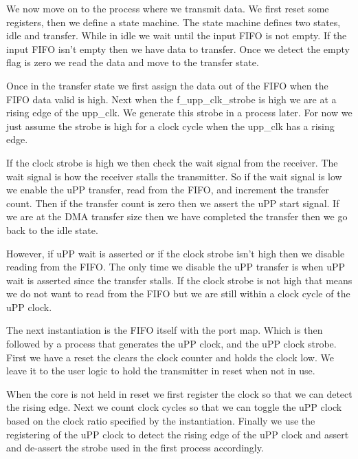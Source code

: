 We now move on to the process where we transmit data. We first reset some registers, then we define a state machine. The state machine defines two states, idle and transfer. While in idle we wait until the input \ac{FIFO} is not empty. If the input \ac{FIFO} isn't empty then we have data to transfer. Once we detect the empty flag is zero we read the data and move to the transfer state. 

Once in the transfer state we first assign the data out of the \ac{FIFO} when the \ac{FIFO} data valid is high. Next when the f\_upp\_clk\_strobe is high we are at a rising edge of the upp\_clk. We generate this strobe in a process later. For now we just assume the strobe is high for a clock cycle when the upp\_clk has a rising edge. 

If the clock strobe is high we then check the wait signal from the receiver. The wait signal is how the receiver stalls the transmitter. So if the wait signal is low we enable the \ac{uPP} transfer, read from the \ac{FIFO}, and increment the transfer count. Then if the transfer count is zero then we assert the \ac{uPP} start signal. If we are at the \ac{DMA} transfer size then we have completed the transfer then we go back to the idle state. 

However, if \ac{uPP} wait is asserted or if the clock strobe isn't high then we disable reading from the \ac{FIFO}. The only time we disable the \ac{uPP} transfer is when \ac{uPP} wait is asserted since the transfer stalls. If the clock strobe is not high that means we do not want to read from the \ac{FIFO} but we are still within a clock cycle of the \ac{uPP} clock. 

The next instantiation is the \ac{FIFO} itself with the port map. Which is then followed by a process that generates the \ac{uPP} clock, and the \ac{uPP} clock strobe. First we have a reset the clears the clock counter and holds the clock low. We leave it to the user logic to hold the transmitter in reset when not in use. 

When the core is not held in reset we first register the clock so that we can detect the rising edge. Next we count clock cycles so that we can toggle the \ac{uPP} clock based on the clock ratio specified by the instantiation. Finally we use the registering of the \ac{uPP} clock to detect the rising edge of the \ac{uPP} clock and assert and de-assert the strobe used in the first process accordingly.


